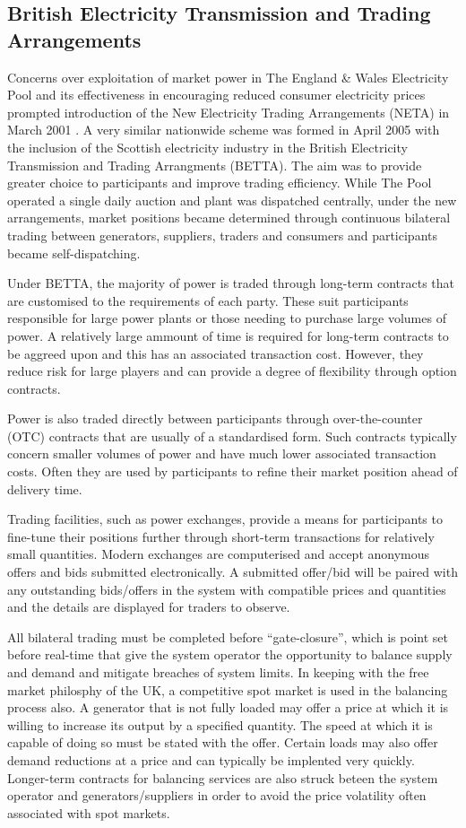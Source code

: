 \subsection{British Electricity Transmission and Trading Arrangements}
\label{sec:betta}
Concerns over exploitation of market power in The England \& Wales Electricity
Pool and its effectiveness in encouraging reduced consumer electricity prices
prompted introduction of the New Electricity Trading Arrangements (NETA) in
March 2001 \cite{martoccia:pool}.  A very similar nationwide scheme was formed
in April 2005 with the inclusion of the Scottish electricity industry in the
British Electricity Transmission and Trading Arrangments (BETTA).  The aim was
to provide greater choice to participants and improve trading efficiency.
While The Pool operated a single daily auction and plant was dispatched
centrally, under the new arrangements, market positions became determined
through continuous bilateral trading between generators, suppliers, traders and
consumers and participants became self-dispatching.

Under BETTA, the majority of power is traded through long-term contracts
that are customised to the requirements of each party.  These suit participants
responsible for large power plants or those needing to purchase large volumes of
power.  A relatively large ammount of time is required for long-term contracts
to be aggreed upon and this has an associated transaction cost.  However, they
reduce risk for large players and can provide a degree of flexibility through
option contracts.

Power is also traded directly between participants through over-the-counter
(OTC) contracts that are usually of a standardised form.  Such contracts
typically concern smaller volumes of power and have much lower associated
transaction costs.  Often they are used by participants to refine their market
position ahead of delivery time.

Trading facilities, such as power exchanges, provide a means for participants to
fine-tune their positions further through short-term transactions for relatively
small quantities.  Modern exchanges are computerised and accept anonymous
offers and bids submitted electronically.  A submitted offer/bid will be paired
with any outstanding bids/offers in the system with compatible prices and
quantities and the details are displayed for traders to observe.

All bilateral trading must be completed before ``gate-closure'', which is point
set before real-time that give the system operator the opportunity to balance
supply and demand and mitigate breaches of system limits.  In keeping with the
free market philosphy of the UK, a competitive spot market is used in the
balancing process also.  A generator that is not fully loaded may offer a price
at which it is willing to increase its output by a specified quantity.  The
speed at which it is capable of doing so must be stated with the offer.
Certain loads may also offer demand reductions at a price and can typically be
implented very quickly.  Longer-term contracts for balancing services are also
struck beteen the system operator and generators/suppliers in order to avoid
the price volatility often associated with spot markets.

